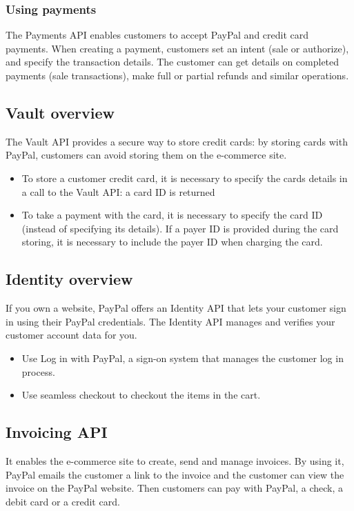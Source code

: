 \documentclass[a4paper, 10pt, titlepage]{article}
\begin{document}
\subsubsection*{Using payments}
The Payments API enables customers to accept PayPal and credit card payments. When creating a payment, customers set an intent (sale or authorize), and specify the transaction details. The customer can get details on completed payments (sale transactions), make full or partial refunds and similar operations.

\subsection{Vault overview}
The Vault API provides a secure way to store credit cards: by storing cards with PayPal, customers can avoid storing them on the e-commerce site.
\begin{itemize}
\item To store a customer credit card, it is necessary to specify the cards details in a call to the Vault API: a card ID is returned
\item To take a payment with the card, it is necessary to specify the card ID (instead of specifying its details). If a payer ID is provided during the card storing, it is necessary to include the payer ID when charging the card.
\end{itemize}

\subsection{Identity overview}
If you own a website, PayPal offers an Identity API that lets your customer sign in using their PayPal credentials. The Identity API manages and verifies your customer account data for you.
\begin{itemize}
\item Use Log in with PayPal, a sign-on system that manages the customer log in process.
\item Use seamless checkout to checkout the  items in the cart.
\end{itemize}

\subsection{Invoicing API}
It enables the e-commerce site to create, send and manage invoices. By using it, PayPal emails the customer a link to the invoice and the customer can view the invoice on the PayPal website. Then customers can pay with PayPal, a check, a debit card or a credit card.
\end{document}
